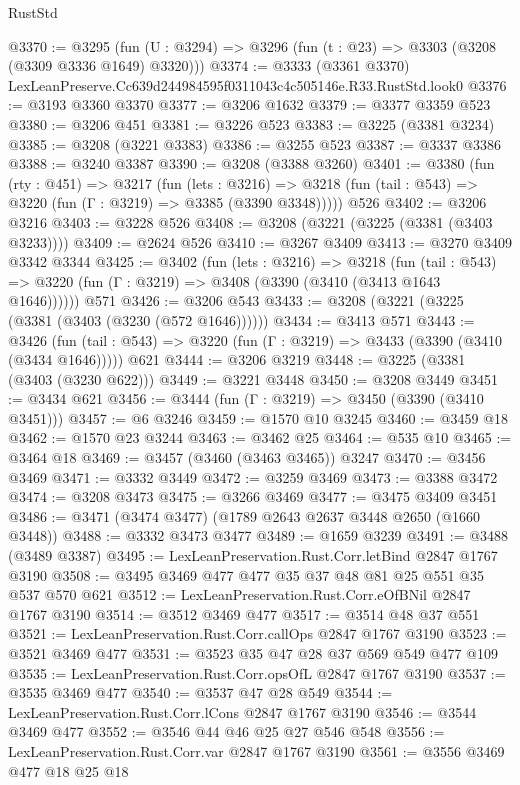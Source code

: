 \begin{lexlean}{RustStd}
\begin{coremodule}
@3370 := @3295 (fun (U : @3294) => @3296 (fun (t : @23) => @3303 (@3208 (@3309 @3336 @1649) @3320)))
@3374 := @3333 (@3361 @3370) LexLeanPreserve.Cc639d244984595f0311043c4c505146e.R33.RustStd.look0
@3376 := @3193 @3360 @3370
@3377 := @3206 @1632
@3379 := @3377 @3359 @523
@3380 := @3206 @451
@3381 := @3226 @523
@3383 := @3225 (@3381 @3234)
@3385 := @3208 (@3221 @3383)
@3386 := @3255 @523
@3387 := @3337 @3386
@3388 := @3240 @3387
@3390 := @3208 (@3388 @3260)
@3401 := @3380
    (fun (rty : @451) =>
    @3217
      (fun (lets : @3216) =>
      @3218 (fun (tail : @543) => @3220 (fun (Γ : @3219) => @3385 (@3390 @3348)))))
    @526
@3402 := @3206 @3216
@3403 := @3228 @526
@3408 := @3208 (@3221 (@3225 (@3381 (@3403 @3233))))
@3409 := @2624 @526
@3410 := @3267 @3409
@3413 := @3270 @3409 @3342 @3344
@3425 := @3402
    (fun (lets : @3216) =>
    @3218
      (fun (tail : @543) => @3220 (fun (Γ : @3219) => @3408 (@3390 (@3410 (@3413 @1643 @1646))))))
    @571
@3426 := @3206 @543
@3433 := @3208 (@3221 (@3225 (@3381 (@3403 (@3230 (@572 @1646))))))
@3434 := @3413 @571
@3443 := @3426
    (fun (tail : @543) => @3220 (fun (Γ : @3219) => @3433 (@3390 (@3410 (@3434 @1646)))))
    @621
@3444 := @3206 @3219
@3448 := @3225 (@3381 (@3403 (@3230 @622)))
@3449 := @3221 @3448
@3450 := @3208 @3449
@3451 := @3434 @621
@3456 := @3444 (fun (Γ : @3219) => @3450 (@3390 (@3410 @3451)))
@3457 := @6 @3246
@3459 := @1570 @10 @3245
@3460 := @3459 @18
@3462 := @1570 @23 @3244
@3463 := @3462 @25
@3464 := @535 @10
@3465 := @3464 @18
@3469 := @3457 (@3460 (@3463 @3465)) @3247
@3470 := @3456 @3469
@3471 := @3332 @3449
@3472 := @3259 @3469
@3473 := @3388 @3472
@3474 := @3208 @3473
@3475 := @3266 @3469
@3477 := @3475 @3409 @3451
@3486 := @3471 (@3474 @3477) (@1789 @2643 @2637 @3448 @2650 (@1660 @3448))
@3488 := @3332 @3473 @3477
@3489 := @1659 @3239
@3491 := @3488 (@3489 @3387)
@3495 := LexLeanPreservation.Rust.Corr.letBind @2847 @1767 @3190
@3508 := @3495 @3469 @477 @477 @35 @37 @48 @81 @25 @551 @35 @537 @570 @621
@3512 := LexLeanPreservation.Rust.Corr.eOfBNil @2847 @1767 @3190
@3514 := @3512 @3469 @477
@3517 := @3514 @48 @37 @551
@3521 := LexLeanPreservation.Rust.Corr.callOps @2847 @1767 @3190
@3523 := @3521 @3469 @477
@3531 := @3523 @35 @47 @28 @37 @569 @549 @477 @109
@3535 := LexLeanPreservation.Rust.Corr.opsOfL @2847 @1767 @3190
@3537 := @3535 @3469 @477
@3540 := @3537 @47 @28 @549
@3544 := LexLeanPreservation.Rust.Corr.lCons @2847 @1767 @3190
@3546 := @3544 @3469 @477
@3552 := @3546 @44 @46 @25 @27 @546 @548
@3556 := LexLeanPreservation.Rust.Corr.var @2847 @1767 @3190
@3561 := @3556 @3469 @477 @18 @25 @18

\end{coremodule}
\end{lexlean}
